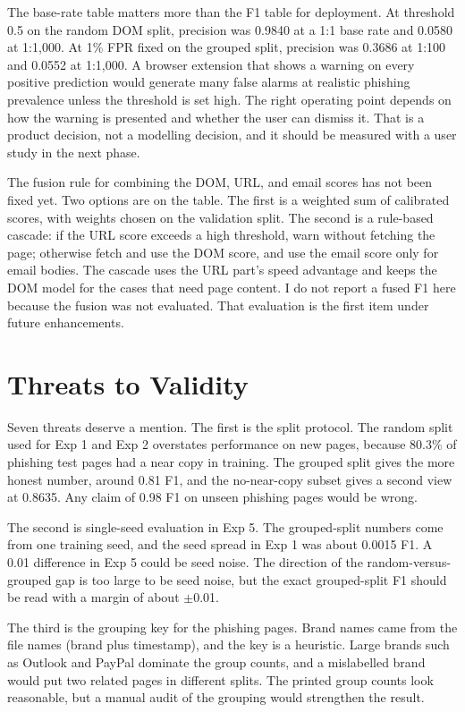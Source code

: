 \documentclass{FastFyp}
\begin{document}
The base-rate table matters more than the F1 table for deployment. At threshold 0.5 on the random DOM split, precision was 0.9840 at a 1:1 base rate and 0.0580 at 1:1{,}000. At 1\% FPR fixed on the grouped split, precision was 0.3686 at 1:100 and 0.0552 at 1:1{,}000. A browser extension that shows a warning on every positive prediction would generate many false alarms at realistic phishing prevalence unless the threshold is set high. The right operating point depends on how the warning is presented and whether the user can dismiss it. That is a product decision, not a modelling decision, and it should be measured with a user study in the next phase.

The fusion rule for combining the DOM, URL, and email scores has not been fixed yet. Two options are on the table. The first is a weighted sum of calibrated scores, with weights chosen on the validation split. The second is a rule-based cascade: if the URL score exceeds a high threshold, warn without fetching the page; otherwise fetch and use the DOM score, and use the email score only for email bodies. The cascade uses the URL part's speed advantage and keeps the DOM model for the cases that need page content. I do not report a fused F1 here because the fusion was not evaluated. That evaluation is the first item under future enhancements.

\section{Threats to Validity}
\label{sec:threats}

Seven threats deserve a mention. The first is the split protocol. The random split used for Exp 1 and Exp 2 overstates performance on new pages, because 80.3\% of phishing test pages had a near copy in training. The grouped split gives the more honest number, around 0.81 F1, and the no-near-copy subset gives a second view at 0.8635. Any claim of 0.98 F1 on unseen phishing pages would be wrong.

The second is single-seed evaluation in Exp 5. The grouped-split numbers come from one training seed, and the seed spread in Exp 1 was about 0.0015 F1. A 0.01 difference in Exp 5 could be seed noise. The direction of the random-versus-grouped gap is too large to be seed noise, but the exact grouped-split F1 should be read with a margin of about $\pm$0.01.

The third is the grouping key for the phishing pages. Brand names came from the file names (brand plus timestamp), and the key is a heuristic. Large brands such as Outlook and PayPal dominate the group counts, and a mislabelled brand would put two related pages in different splits. The printed group counts look reasonable, but a manual audit of the grouping would strengthen the result.
\end{document}
